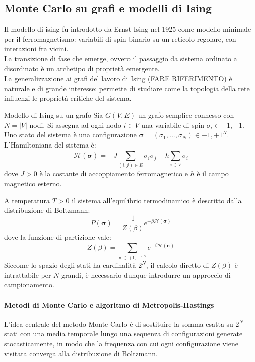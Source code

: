 \subsection{Monte Carlo su grafi e modelli di Ising}
Il modello di ising fu introdotto da Ernst Ising nel 1925 come modello minimale per il ferromagnetismo: variabili di spin binario su un reticolo regolare, con interazioni fra vicini.\\
La transizione di fase che emerge, ovvero il passaggio da sistema ordinato a disordinato è un archetipo di proprietà emergente.\\

La generalizzazione ai grafi del lavoro di Ising (FARE RIFERIMENTO) è naturale e di grande interesse: permette di studiare come la topologia della rete influenzi le proprietà critiche del sistema.

\begin{boxb}{Modello di Ising su un grafo}
Sia $G(V,E)$ un grafo semplice connesso con $N=\left\lvert V\right\rvert$ nodi. Si assegna ad ogni nodo $i \in V$ una variabile di spin $\sigma_i \in {-1,+1}$. Uno stato del sistema è una configurazione $\mathbf{\sigma}=(\sigma_1,...,\sigma_N) \in {-1,+1}^N$.\\
L'Hamiltoniana del sistema è:
\begin{equation}
    \mathcal{H}(\mathbf{\sigma})=-J\sum_{(i,j) \in E}^{}\sigma_i\sigma_j-h\sum_{i \in V}^{}\sigma_i
\end{equation}
dove $J >0$ è la costante di accoppiamento ferromagnetico e $h$ è il campo magnetico esterno.
\end{boxb}
A temperatura $T >0$ il sistema all'equilibrio termodinamico è descritto dalla distribuzione di Boltzmann:
\begin{equation}
    P(\mathbf{\sigma})=\frac{1}{Z(\beta)}e^{-\beta\mathcal{H}(\mathbf{\sigma})}
\end{equation}
dove la funzione di partizione vale:
\begin{equation}
    Z(\beta)=\sum_{\mathbf{\sigma}\in {+1,-1}^N}^{}e^{-\beta \mathcal{H}(\mathbf{\sigma})}
\end{equation}
Siccome lo spazio degli stati ha cardinalità $2^N$, il calcolo diretto di $Z(\beta)$ è intrattabile per $N$ grandi, è necessario dunque introdurre un approccio di campionamento.
\paragraph{Metodi di Monte Carlo e algoritmo di Metropolis-Hastings}
L'idea centrale del metodo Monte Carlo è di sostituire la somma esatta su $2^N$ stati con una media temporale lungo una sequenza di configurazioni generate stocasticamente, in modo che la frequenza con cui ogni configurazione viene visitata converga alla distribuzione di Boltzmann.\\

